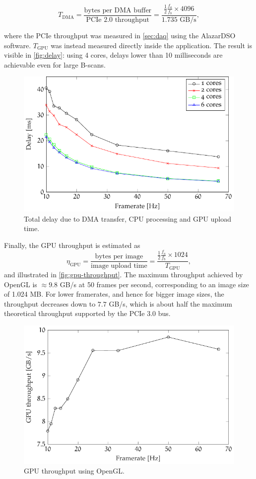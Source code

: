 \begin{equation}
	T_{\text{DMA}} = \frac{\text{bytes per DMA buffer}}{\text{PCIe 2.0 throughput}} = \frac{\frac{1}{2}\frac{f_a}{f_b}\times 4096}{1.735 \text{ GB/s}},
\end{equation} 

where the PCIe throughput was measured in \autoref{sec:daq} using the AlazarDSO software. $T_{\text{GPU}}$ was instead measured directly inside the application. The result is visible in \autoref{fig:delay}: using 4 cores, delays lower
than 10 milliseconds are achievable even for large B-scans. 


\begin{figure}[htb]
	\myfloatalign
	\includegraphics[width=0.8\linewidth]{gfx/ch4/delay}
	\caption{Total delay due to DMA transfer, CPU processing and GPU upload time.}\label{fig:delay}
\end{figure}

Finally, the GPU throughput is estimated as 
\begin{equation}
\eta_{\text{GPU}} = \frac{\text{bytes per image}}{\text{image upload time}} = \frac{\frac{1}{2}\frac{f_a}{f_b} \times 1024}{T_{\text{GPU}}},
\end{equation}
and illustrated in \autoref{fig:gpu-throughput}. The maximum throughput achieved by OpenGL is $\approx 9.8$ GB/s at 50 frames per second, corresponding to an image size of 1.024 MB. For lower framerates, and hence for bigger image sizes, the throughput decreases down to $7.7$ GB/s, which is about half the  maximum theoretical throughput supported by the PCIe 3.0 bus. 
\begin{figure}[htb]
	\myfloatalign
	\includegraphics[width=0.8\linewidth]{gfx/ch4/gpu-throughput}
	\caption{GPU throughput using OpenGL.}\label{fig:gpu-throughput}
\end{figure}


